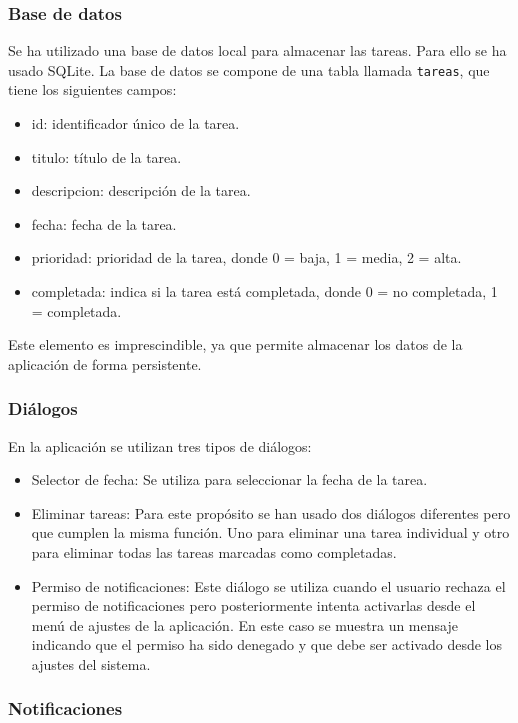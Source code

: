 \documentclass{article}
\begin{document}
\subsubsection{Base de datos}

Se ha utilizado una base de datos local para almacenar las tareas. Para ello se ha usado SQLite. La base de datos se compone de una tabla llamada \texttt{tareas}, que tiene los siguientes campos:

\begin{itemize}
    \item id: identificador único de la tarea.
    \item titulo: título de la tarea.
    \item descripcion: descripción de la tarea.
    \item fecha: fecha de la tarea.
    \item prioridad: prioridad de la tarea, donde 0 = baja, 1 = media, 2 = alta.
    \item completada: indica si la tarea está completada, donde 0 = no completada, 1 = completada.
\end{itemize}

Este elemento es imprescindible, ya que permite almacenar los datos de la aplicación de forma persistente.

\subsubsection{Diálogos}

En la aplicación se utilizan tres tipos de diálogos:

\begin{itemize}
    \item Selector de fecha: Se utiliza para seleccionar la fecha de la tarea.
    \item Eliminar tareas: Para este propósito se han usado dos diálogos diferentes pero que cumplen la misma función. Uno para eliminar una tarea individual y otro para eliminar todas las tareas marcadas como completadas.
    \item Permiso de notificaciones: Este diálogo se utiliza cuando el usuario rechaza el permiso de notificaciones pero posteriormente intenta activarlas desde el menú de ajustes de la aplicación. En este caso se muestra un mensaje indicando que el permiso ha sido denegado y que debe ser activado desde los ajustes del sistema.
\end{itemize}

\subsubsection{Notificaciones}
\end{document}
